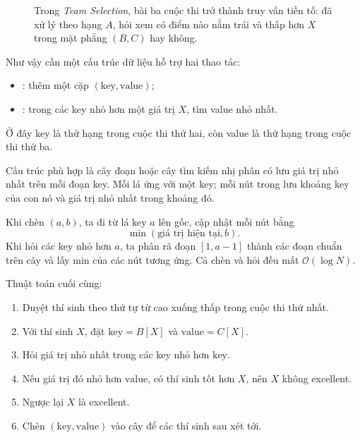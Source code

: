 \documentclass[11pt]{article}
\newcommand{\Oh}{\mathcal{O}}
\begin{document}
\begin{figure}[ht]
\centering
{}
\caption{Trong \textit{Team Selection}, bài ba cuộc thi trở thành truy vấn
tiền tố: đã xử lý theo hạng \(A\), hỏi xem có điểm nào nằm trái và thấp hơn
\(X\) trong mặt phẳng \((B,C)\) hay không.}
\end{figure}

Như vậy cần một cấu trúc dữ liệu hỗ trợ hai thao tác:
\begin{itemize}
  \item {}: thêm một cặp $(\text{key},\text{value})$;
  \item {}: trong các key nhỏ hơn một giá trị $X$, tìm value nhỏ nhất.
\end{itemize}
Ở đây key là thứ hạng trong cuộc thi thứ hai, còn value là thứ hạng trong cuộc
thi thứ ba.

Cấu trúc phù hợp là cây đoạn hoặc cây tìm kiếm nhị phân có lưu giá trị nhỏ
nhất trên mỗi đoạn key. Mỗi lá ứng với một key; mỗi nút trong lưu khoảng key
của con nó và giá trị nhỏ nhất trong khoảng đó.

Khi chèn $(a,b)$, ta đi từ lá key $a$ lên gốc, cập nhật mỗi nút bằng
\[
  \min(\text{giá trị hiện tại}, b).
\]
Khi hỏi các key nhỏ hơn $a$, ta phân rã đoạn $[1,a-1]$ thành các đoạn chuẩn
trên cây và lấy min của các nút tương ứng. Cả chèn và hỏi đều mất
$\Oh(\log N)$.

Thuật toán cuối cùng:
\begin{enumerate}
  \item Duyệt thí sinh theo thứ tự từ cao xuống thấp trong cuộc thi thứ nhất.
  \item Với thí sinh $X$, đặt $\text{key}=B[X]$ và $\text{value}=C[X]$.
  \item Hỏi giá trị nhỏ nhất trong các key nhỏ hơn $\text{key}$.
  \item Nếu giá trị đó nhỏ hơn $\text{value}$, có thí sinh tốt hơn $X$, nên
  $X$ không excellent.
  \item Ngược lại $X$ là excellent.
  \item Chèn $(\text{key},\text{value})$ vào cây để các thí sinh sau xét tới.
\end{enumerate}
\end{document}
